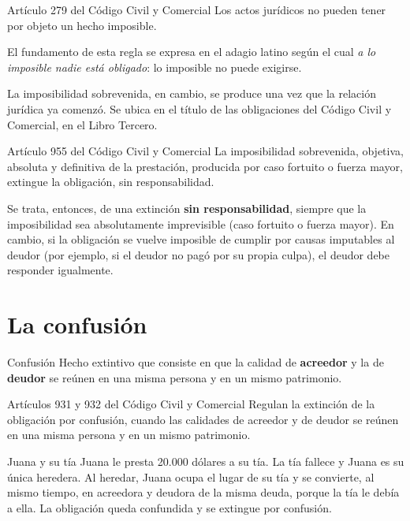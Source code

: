 \documentclass[12pt,oneside]{book}
\begin{document}
\begin{articulo}{Artículo 279 del Código Civil y Comercial}
Los actos jurídicos no pueden tener por objeto un hecho imposible.
\end{articulo}

El fundamento de esta regla se expresa en el adagio latino según el cual \textit{a lo imposible nadie está obligado}: lo imposible no puede exigirse.

La imposibilidad sobrevenida, en cambio, se produce una vez que la relación jurídica ya comenzó. Se ubica en el título de las obligaciones del Código Civil y Comercial, en el Libro Tercero.

\begin{articulo}{Artículo 955 del Código Civil y Comercial}
La imposibilidad sobrevenida, objetiva, absoluta y definitiva de la prestación, producida por caso fortuito o fuerza mayor, extingue la obligación, sin responsabilidad.
\end{articulo}

Se trata, entonces, de una extinción \textbf{sin responsabilidad}, siempre que la imposibilidad sea absolutamente imprevisible (caso fortuito o fuerza mayor). En cambio, si la obligación se vuelve imposible de cumplir por causas imputables al deudor (por ejemplo, si el deudor no pagó por su propia culpa), el deudor debe responder igualmente.

\section{La confusión}

\begin{definition}{Confusión}
Hecho extintivo que consiste en que la calidad de \textbf{acreedor} y la de \textbf{deudor} se reúnen en una misma persona y en un mismo patrimonio.
\end{definition}

\begin{articulo}{Artículos 931 y 932 del Código Civil y Comercial}
Regulan la extinción de la obligación por confusión, cuando las calidades de acreedor y de deudor se reúnen en una misma persona y en un mismo patrimonio.
\end{articulo}

\begin{example}{Juana y su tía}
Juana le presta 20.000 dólares a su tía. La tía fallece y Juana es su única heredera. Al heredar, Juana ocupa el lugar de su tía y se convierte, al mismo tiempo, en acreedora y deudora de la misma deuda, porque la tía le debía a ella. La obligación queda confundida y se extingue por confusión.
\end{example}
\end{document}
